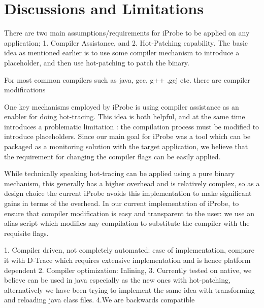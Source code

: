 \section{Discussions  and Limitations}
\label{sec:disc_limitations}

There are two main assumptions/requirements for iProbe to be applied on any application; 1. Compiler Assistance, and 2. Hot-Patching capability. The basic idea as mentioned earlier is to use some compiler mechanism to introduce a placeholder, and then use hot-patching to patch the binary. 

For most common compilers such as java, gcc, g++ ,gcj etc. there are compiler modifications

One key mechanisms employed by iProbe is using compiler assistance as an enabler for doing hot-tracing. This idea is both helpful, and at the same time introduces a problematic limitation : the compilation process must be modified to introduce placeholders. Since our main goal for iProbe was a tool which can be packaged as a monitoring solution with the target application, we believe that the requirement for changing the compiler flags can be easily applied.

While technically speaking hot-tracing can be applied using a pure binary mechanism\cite{pannus,livepatch}, this generally has a higher overhead and is relatively complex, so as a design choice the current iProbe avoids this implementation to make significant gains in terms of the overhead. In our current implementation of iProbe, to ensure that compiler modification is easy and transparent to the user: we use an alias script which modifies any compilation to substitute the compiler with the requisite flags. 


1. Compiler driven, not completely automated: ease of implementation, compare it 
with D-Trace which requires extensive implementation and is hence platform 
dependent
2. Compiler optimization: Inlining, 
3. Currently tested on native, we believe can be used in java especially as the 
new ones with hot-patching, alternatively we have been trying to implement the 
same idea with transforming and reloading java class files.
4.We are backwards compatible